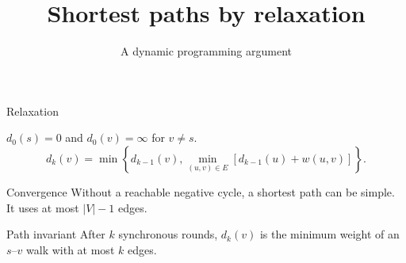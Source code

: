 \documentclass[aspectratio=169]{beamer}
\title{Shortest paths by relaxation}
\subtitle{A dynamic programming argument}
\author{}\date{}
\begin{document}
\begin{frame}
\titlepage
\end{frame}
\begin{frame}{Relaxation}
\begin{figure}
\centering
{}
\end{figure}
\pause
$d_0(s)=0$ and $d_0(v)=\infty$ for $v\ne s$.
\[d_k(v)=\min\left\{d_{k-1}(v),\min_{(u,v)\in E}
[d_{k-1}(u)+w(u,v)]\right\}.\]
\end{frame}
\begin{frame}{Convergence}
\Large
Without a reachable negative cycle, a shortest path can be simple.
It uses at most $|V|-1$ edges.
\end{frame}
\begin{frame}{Path invariant}
\Large
After $k$ synchronous rounds, $d_k(v)$ is the minimum weight
of an $s$--$v$ walk with at most $k$ edges.
\end{frame}
\end{document}
